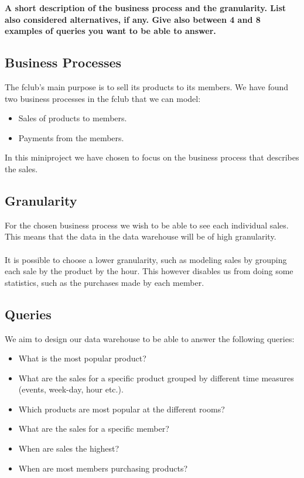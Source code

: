\textbf{A short description of the business process and the granularity.
List also considered alternatives, if any.
Give also between 4 and 8 examples of queries you want to be able to answer.}

\subsection{Business Processes}
The fclub's main purpose is to sell its products to its members.
We have found two business processes in the fclub that we can model:

\begin{itemize}
	\item Sales of products to members.
	\item Payments from the members.
\end{itemize}

In this miniproject we have chosen to focus on the business process that describes the sales.


\subsection{Granularity}
For the chosen business process we wish to be able to see each individual sales.
This means that the data in the data warehouse will be of high granularity. \\
\\
It is possible to choose a lower granularity, such as modeling sales by grouping each sale by the product by the hour.
This however disables us from doing some statistics, such as the purchases made by each member.


\subsection{Queries}
We aim to design our data warehouse to be able to answer the following queries:

\begin{itemize}
	\item What is the most popular product?
	\item What are the sales for a specific product grouped by different time measures (events, week-day, hour etc.).
	\item Which products are most popular at the different rooms?
	\item What are the sales for a specific member?
	\item When are sales the highest?
	\item When are most members purchasing products?
\end{itemize}

